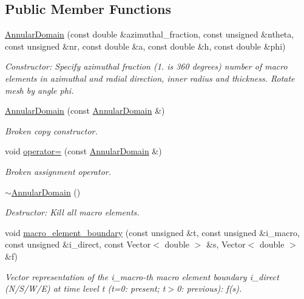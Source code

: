 \subsection*{Public Member Functions}
\begin{DoxyCompactItemize}
\item 
\hyperlink{classoomph_1_1AnnularDomain_aa0b4ad9d8e63de8aa0dc2d462a016143}{Annular\+Domain} (const double \&azimuthal\+\_\+fraction, const unsigned \&ntheta, const unsigned \&nr, const double \&a, const double \&h, const double \&phi)
\begin{DoxyCompactList}\small\item\em Constructor\+: Specify azimuthal fraction (1. is 360 degrees) number of macro elements in azimuthal and radial direction, inner radius and thickness. Rotate mesh by angle phi. \end{DoxyCompactList}\item 
\hyperlink{classoomph_1_1AnnularDomain_ad081791409dc419594d0a64e1c17fb09}{Annular\+Domain} (const \hyperlink{classoomph_1_1AnnularDomain}{Annular\+Domain} \&)
\begin{DoxyCompactList}\small\item\em Broken copy constructor. \end{DoxyCompactList}\item 
void \hyperlink{classoomph_1_1AnnularDomain_a1e66e1208af0b6d0ec4a7006a77dbb5f}{operator=} (const \hyperlink{classoomph_1_1AnnularDomain}{Annular\+Domain} \&)
\begin{DoxyCompactList}\small\item\em Broken assignment operator. \end{DoxyCompactList}\item 
\hyperlink{classoomph_1_1AnnularDomain_a99ee51c9e5fd12fdd123ede8da09c483}{$\sim$\+Annular\+Domain} ()
\begin{DoxyCompactList}\small\item\em Destructor\+: Kill all macro elements. \end{DoxyCompactList}\item 
void \hyperlink{classoomph_1_1AnnularDomain_ade8cfa0e6f2d41e7d3877250321bfff3}{macro\+\_\+element\+\_\+boundary} (const unsigned \&t, const unsigned \&i\+\_\+macro, const unsigned \&i\+\_\+direct, const Vector$<$ double $>$ \&s, Vector$<$ double $>$ \&f)
\begin{DoxyCompactList}\small\item\em Vector representation of the i\+\_\+macro-\/th macro element boundary i\+\_\+direct (N/\+S/\+W/E) at time level t (t=0\+: present; t$>$0\+: previous)\+: f(s). \end{DoxyCompactList}\end{DoxyCompactItemize}
